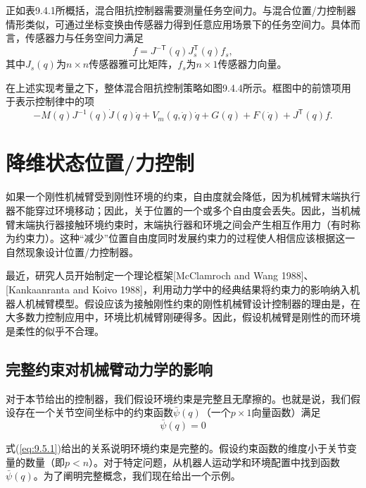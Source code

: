 \documentclass[12pt,a4paper]{ctexart}
\begin{document}
正如表9.4.1所概括，混合阻抗控制器需要测量任务空间力。与混合位置/力控制器情形类似，可通过坐标变换由传感器力得到任意应用场景下的任务空间力。具体而言，传感器力与任务空间力满足
\begin{equation}\label{eq:9.4.32}
f = J^{-\mathsf T}(q) J_s^{\mathsf T}(q) f_s,
\end{equation}
其中$J_s(q)$为$n\times n$传感器雅可比矩阵，$f_s$为$n\times 1$传感器力向量。

在上述实现考量之下，整体混合阻抗控制策略如图9.4.4所示。框图中的前馈项用于表示控制律中的项
\begin{equation}\label{eq:9.4.33}
-M(q)J^{-1}(q)\dot{J}(q)\dot{q} + V_m(q,\dot{q})\dot{q} + G(q) + F(\dot{q}) + J^{\mathsf T}(q)f.
\end{equation}

\section{降维状态位置/力控制}\label{sec:9.5}

如果一个刚性机械臂受到刚性环境的约束，自由度就会降低，因为机械臂末端执行器不能穿过环境移动；因此，关于位置的一个或多个自由度会丢失。因此，当机械臂末端执行器接触环境约束时，末端执行器和环境之间会产生相互作用力（有时称为约束力）。这种``减少''位置自由度同时发展约束力的过程使人相信应该根据这一自然现象设计位置/力控制器。

最近，研究人员开始制定一个理论框架[McClamroch and Wang 1988]、[Kankaanranta and Koivo 1988]，利用动力学中的经典结果将约束力的影响纳入机器人机械臂模型。假设应该为接触刚性约束的刚性机械臂设计控制器的理由是，在大多数力控制应用中，环境比机械臂刚硬得多。因此，假设机械臂是刚性的而环境是柔性的似乎不合理。

\subsection{完整约束对机械臂动力学的影响}

对于本节给出的控制器，我们假设环境约束是完整且无摩擦的。也就是说，我们假设存在一个关节空间坐标中的约束函数$\bar{\psi}(q)$（一个$p \times 1$向量函数）满足
\begin{equation}\label{eq:9.5.1}
\bar{\psi}(q) = 0
\end{equation}

式(\ref{eq:9.5.1})给出的关系说明环境约束是完整的。假设约束函数的维度小于关节变量的数量（即$p < n$）。对于特定问题，从机器人运动学和环境配置中找到函数$\bar{\psi}(q)$。为了阐明完整概念，我们现在给出一个示例。
\end{document}

